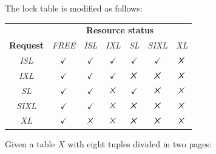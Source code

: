 \begin{itemize}
        The lock table is modified as follows:
    \begin{table}[H]
        \centering
        \begin{tabular}{ccccccc}
        \textbf{}                             & \multicolumn{6}{c}{\textbf{Resource status}}                                                                                                                                                                            \\ \cline{2-7} 
        \multicolumn{1}{c|}{\textbf{Request}} & \multicolumn{1}{c|}{\textit{FREE}} & \multicolumn{1}{c|}{\textit{ISL}} & \multicolumn{1}{c|}{\textit{IXL}} & \multicolumn{1}{c|}{\textit{SL}}  & \multicolumn{1}{c|}{\textit{SIXL}} & \multicolumn{1}{c|}{\textit{XL}}  \\ \hline
        \multicolumn{1}{|c|}{\textit{ISL}}    & \multicolumn{1}{c|}{$\checkmark$}  & \multicolumn{1}{c|}{$\checkmark$} & \multicolumn{1}{c|}{$\checkmark$} & \multicolumn{1}{c|}{$\checkmark$} & \multicolumn{1}{c|}{$\checkmark$}  & \multicolumn{1}{c|}{$\tikzxmark$} \\ \hline
        \multicolumn{1}{|c|}{\textit{IXL}}    & \multicolumn{1}{c|}{$\checkmark$}  & \multicolumn{1}{c|}{$\checkmark$} & \multicolumn{1}{c|}{$\checkmark$} & \multicolumn{1}{c|}{$\tikzxmark$} & \multicolumn{1}{c|}{$\tikzxmark$}  & \multicolumn{1}{c|}{$\tikzxmark$} \\ \hline
        \multicolumn{1}{|c|}{\textit{SL}}     & \multicolumn{1}{c|}{$\checkmark$}  & \multicolumn{1}{c|}{$\checkmark$} & \multicolumn{1}{c|}{$\tikzxmark$} & \multicolumn{1}{c|}{$\checkmark$} & \multicolumn{1}{c|}{$\tikzxmark$}  & \multicolumn{1}{c|}{$\tikzxmark$} \\ \hline
        \multicolumn{1}{|c|}{\textit{SIXL}}   & \multicolumn{1}{c|}{$\checkmark$}  & \multicolumn{1}{c|}{$\checkmark$} & \multicolumn{1}{c|}{$\tikzxmark$} & \multicolumn{1}{c|}{$\tikzxmark$} & \multicolumn{1}{c|}{$\tikzxmark$}  & \multicolumn{1}{c|}{$\tikzxmark$} \\ \hline
        \multicolumn{1}{|c|}{\textit{XL}}     & \multicolumn{1}{c|}{$\checkmark$}  & \multicolumn{1}{c|}{$\tikzxmark$} & \multicolumn{1}{c|}{$\tikzxmark$} & \multicolumn{1}{c|}{$\tikzxmark$} & \multicolumn{1}{c|}{$\tikzxmark$}  & \multicolumn{1}{c|}{$\tikzxmark$} \\ \hline
        \end{tabular}
    \end{table}
    \begin{example}
        Given a table $X$ with eight tuples divided in two pages: 

\end{example}
\end{itemize}
